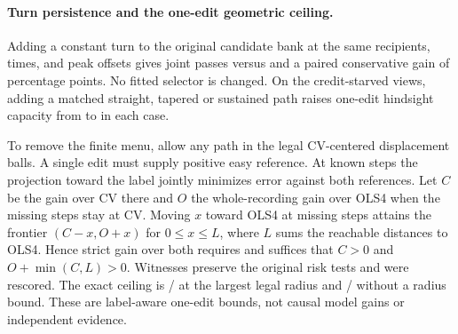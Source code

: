 \paragraph{Turn persistence and the one-edit geometric ceiling.}
Adding a constant turn to the original candidate bank at the same
\TurnEdits{} recipients, times, and peak offsets gives
\TurnJoint{} joint passes versus \TurnAnchor{} and a paired
conservative gain of \TurnEffect{} percentage points.
No fitted selector is changed. On the \TurnViews{} credit-starved
views, adding a matched straight, tapered or sustained path raises
one-edit hindsight capacity from \TurnLegacy{} to \TurnExpanded{}
in each case.

To remove the finite menu, allow any path in the legal CV-centered
displacement balls. A single edit must supply positive easy
reference. At known steps the projection toward the label jointly
minimizes error against both references. Let \(C\) be the gain over
CV there and \(O\) the whole-recording gain over OLS4 when the missing
steps stay at CV. Moving \(x\) toward OLS4 at missing steps attains
the frontier \((C-x,O+x)\) for \(0\leq x\leq L\), where \(L\) sums
the reachable distances to OLS4. Hence strict gain over both
requires and suffices that \(C>0\) and \(O+\min(C,L)>0\).
Witnesses preserve the original risk tests and were rescored.
The exact ceiling is \TurnBounded{}/\TurnViews{} at the largest
legal radius and \TurnUnbounded{}/\TurnViews{} without a radius
bound. These are label-aware one-edit bounds, not causal model
gains or independent evidence.
